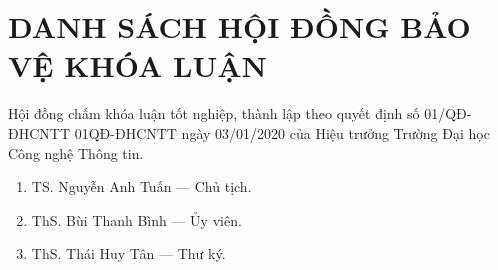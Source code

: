 \documentclass[../main-report.tex]{subfiles}
\begin{document}
\part*{DANH SÁCH HỘI ĐỒNG BẢO VỆ KHÓA LUẬN}
Hội đồng chấm khóa luận tốt nghiệp, thành lập theo quyết định số 01/QĐ-ĐHCNTT 01QĐ-ĐHCNTT ngày 03/01/2020 của Hiệu trưởng Trường Đại học Công nghệ Thông tin.

\begin{enumerate}
\item TS. Nguyễn Anh Tuấn --- Chủ tịch.
\item ThS. Bùi Thanh Bình --- Ủy viên.
\item ThS. Thái Huy Tân --- Thư ký.
\end{enumerate}
\end{document}
